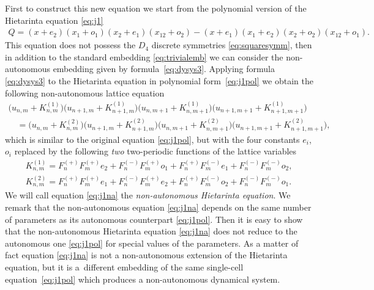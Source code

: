 \documentclass[pdftex]{sigma}
\numberwithin{equation}{section}
\newcommand{\Fp}[1]{F^{(+)}_{#1}}
\newcommand{\Fm}[1]{F^{(-)}_{#1}}
\newcommand{\Fppp}{\Fp{n}\Fp{m}}
\newcommand{\Fpmm}{\Fp{n}\Fm{m}}
\newcommand{\Fmpm}{\Fm{n}\Fp{m}}
\newcommand{\Fmmp}{\Fm{n}\Fm{m}}
\begin{document}
First to construct this new equation we start from the polynomial version of the Hietarinta equation \eqref{eq:j1}
\begin{gather}
 Q = ({x+e_{2}})
 ({x_{1}+o_{1}})
 ({x_{2}+e_{1}})
 ({x_{12}+o_{2}})
 -
 ({x+e_{1}})
 ({x_{1}+e_{2}})
 ({x_{2}+o_{2}})
 ({x_{12}+o_{1}}).
 \label{eq:j1pol}
\end{gather}
This equation does not possess the $D_{4}$
discrete symmetries \eqref{eq:squaresymm},
then in addition to the standard embedding
\eqref{eq:trivialemb} we can consider the non-autonomous
embedding given by formula~\eqref{eq:dysys3}.
Applying formula \eqref{eq:dysys3} to the
Hietarinta equation in polynomial form~\eqref{eq:j1pol}
we obtain the following non-autonomous lattice equation
\begin{gather}
 \big(u_{n,m}+K^{(1)}_{n,m}\big)
 \big(u_{n+1,m}+K^{(1)}_{n+1,m}\big)
 \big(u_{n,m+1}+K^{(1)}_{n,m+1}\big)
 \big(u_{n+1,m+1}+K^{(1)}_{n+1,m+1}\big)\nonumber \\
\quad{} =
 \big(u_{n,m}+K^{(2)}_{n,m}\big)
 \big(u_{n+1,m}+K^{(2)}_{n+1,m}\big)
 \big(u_{n,m+1}+K^{(2)}_{n,m+1}\big)
 \big(u_{n+1,m+1}+K^{(2)}_{n+1,m+1}\big), \!\!\!\!\label{eq:j1na}
\end{gather}
which is similar to the original equation
\eqref{eq:j1pol}, but with the four constants $e_{i}$,
$o_{i}$ replaced by the following \emph{two} two-periodic
functions of the lattice variables
 \begin{gather*}
 K^{(1)}_{n,m} = \Fppp e_{2}+ \Fmpm o_{1} + \Fpmm e_{1}+ \Fmmp o_{2} , \label{eq:o1} \\
 K^{(2)}_{n,m} = \Fppp e_{1}+ \Fmpm e_{2} +\Fpmm o_{2} + \Fmmp o_{1}. \label{eq:o2}
 \end{gather*}
We will call equation \eqref{eq:j1na} the \emph{non-autonomous
Hietarinta equation}.
We remark that the non-autonomous equation \eqref{eq:j1na} depends
on the same number of parameters as its autonomous counterpart \eqref{eq:j1pol}.
Then it is easy to show that the non-autonomous Hietarinta
equation \eqref{eq:j1na} does not reduce to the autonomous one \eqref{eq:j1pol}
for special values of the parameters.
As a matter of fact equation \eqref{eq:j1na} is not a non-autonomous
extension of the Hietarinta equation, but it is a~dif\/ferent
embedding of the same single-cell equation~\eqref{eq:j1pol}
which produces a non-autonomous dynamical system.
\end{document}
